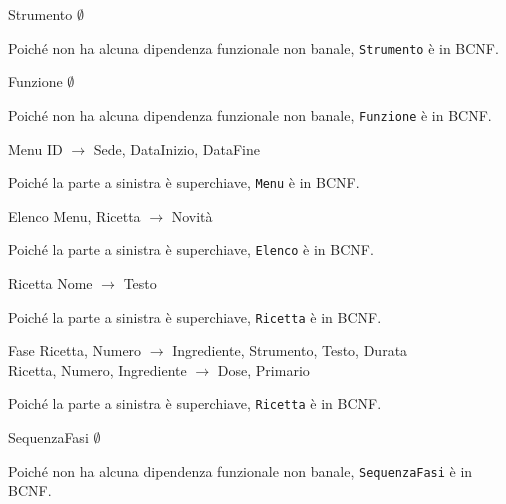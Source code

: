 \begin{samepage}
\begin{funcdep}{Strumento}
    $\emptyset$
\end{funcdep}
Poiché non ha alcuna dipendenza funzionale non banale, {\tt Strumento} è in BCNF.
\end{samepage}

\begin{samepage}
\begin{funcdep}{Funzione}
    $\emptyset$
\end{funcdep}
Poiché non ha alcuna dipendenza funzionale non banale, {\tt Funzione} è in BCNF.
\end{samepage}

\begin{samepage}
\begin{funcdep}{Menu}
    ID $\to$ Sede, DataInizio, DataFine
\end{funcdep}
Poiché la parte a sinistra è superchiave, {\tt Menu} è in BCNF.
\end{samepage}

\begin{samepage}
\begin{funcdep}{Elenco}
    Menu, Ricetta $\to$ Novità
\end{funcdep}
Poiché la parte a sinistra è superchiave, {\tt Elenco} è in BCNF.
\end{samepage}

\begin{samepage}
\begin{funcdep}{Ricetta}
    Nome $\to$ Testo
\end{funcdep}
Poiché la parte a sinistra è superchiave, {\tt Ricetta} è in BCNF.
\end{samepage}

\begin{samepage}
\begin{funcdep}{Fase}
    Ricetta, Numero $\to$ Ingrediente, Strumento, Testo, Durata\\
    Ricetta, Numero, Ingrediente $\to$ Dose, Primario
\end{funcdep}
Poiché la parte a sinistra è superchiave, {\tt Ricetta} è in BCNF.
\end{samepage}

\begin{samepage}
\begin{funcdep}{SequenzaFasi}
    $\emptyset$
\end{funcdep}
Poiché non ha alcuna dipendenza funzionale non banale, {\tt SequenzaFasi} è in BCNF.
\end{samepage}

